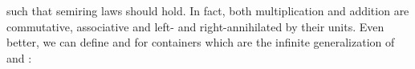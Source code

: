 \begin{code}
\>[0]\AgdaSymbol{(}\AgdaSpace{}%
\AgdaSpace{}%
\AgdaSymbol{)}\AgdaSpace{}%
\AgdaSpace{}%
\AgdaSymbol{(}\AgdaSpace{}%
\AgdaSpace{}%
\AgdaSymbol{)}\AgdaSpace{}%
\AgdaSymbol{=}\AgdaSpace{}%
\AgdaSymbol{(}\AgdaSpace{}%
\AgdaSpace{}%
\AgdaSymbol{)}\AgdaSpace{}%
\AgdaSpace{}%
\AgdaSpace{}%
\AgdaSymbol{(}\AgdaSpace{}%
\AgdaSymbol{)}\AgdaSpace{}%
\AgdaSpace{}%
\AgdaSpace{}%
\AgdaSpace{}%
\AgdaSymbol{;}\AgdaSpace{}%
\AgdaSymbol{(}\AgdaSpace{}%
\AgdaSymbol{)}\AgdaSpace{}%
\AgdaSpace{}%
\AgdaSpace{}%
\AgdaSpace{}%
\AgdaSymbol{\}}\<%
\end{code}

such that semiring laws should hold. In fact, both multiplication and addition are commutative, associative and left- and right-annihilated by their units. Even better, we can define  and  for containers which are the infinite generalization of  and :

\begin{code}[hide]%
\>[0]\AgdaSpace{}%
\AgdaModule{\AgdaUnderscore{}}\AgdaSpace{}%
\<%
\\
\>[0][@{}l@{\AgdaIndent{0}}]%
\>[2]\AgdaSpace{}%
\<%
\end{code}

